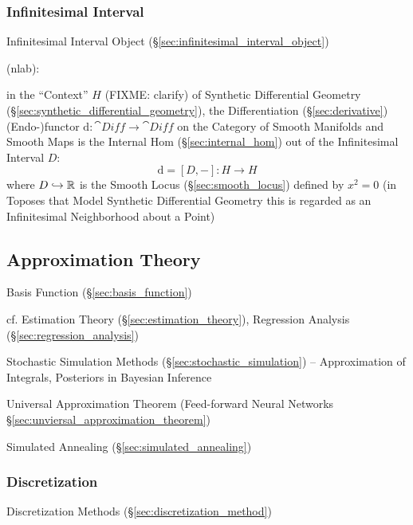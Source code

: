 \subsubsection{Infinitesimal Interval}\label{sec:infinitesimal_interval}

\fist Infinitesimal Interval Object (\S\ref{sec:infinitesimal_interval_object})

(nlab):

in the ``Context'' $H$ (FIXME: clarify) of Synthetic Differential Geometry
(\S\ref{sec:synthetic_differential_geometry}), the Differentiation
(\S\ref{sec:derivative}) (Endo-)functor $\mathrm{d} : \cat{Diff} \rightarrow
\cat{Diff}$ on the Category of Smooth Manifolds and Smooth Maps is the Internal
Hom (\S\ref{sec:internal_hom}) out of the Infinitesimal Interval $D$:
\[
  \mathrm{d} = [D,-] : H \rightarrow H
\]
where $D \hookrightarrow \mathbb{R}$ is the Smooth Locus (\S\ref{sec:smooth_locus})
defined by $x^2 = 0$ (in Toposes that Model Synthetic Differential Geometry this
is regarded as an Infinitesimal Neighborhood about a Point)



\subsection{Approximation Theory}\label{sec:approximation_theory}

Basis Function (\S\ref{sec:basis_function})

\fist cf. Estimation Theory (\S\ref{sec:estimation_theory}), Regression Analysis
(\S\ref{sec:regression_analysis})

Stochastic Simulation Methods (\S\ref{sec:stochastic_simulation}) --
Approximation of Integrals, Posteriors in Bayesian Inference

\fist Universal Approximation Theorem (Feed-forward Neural Networks
\S\ref{sec:unviersal_approximation_theorem})

\fist Simulated Annealing (\S\ref{sec:simulated_annealing})



\subsubsection{Discretization}\label{sec:discretization}

Discretization Methods (\S\ref{sec:discretization_method})



